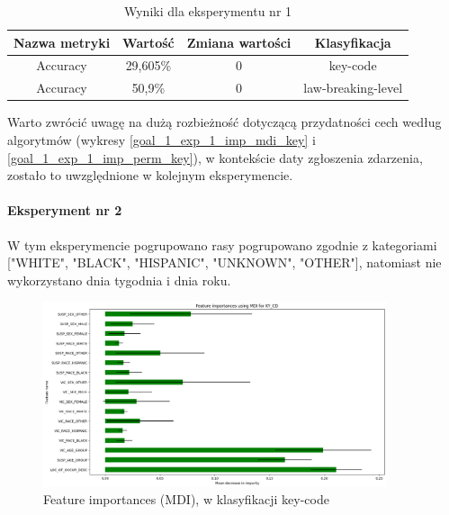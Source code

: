 \documentclass{classrep}
\begin{document}
{{{{                    \begin{table}
                    \centering
                     \begin{tabular}{|c|c|c|c|}
                            \hline
                          Nazwa metryki & Wartość & Zmiana wartości & Klasyfikacja \\ \hline
                            Accuracy &  29,605\% & 0 & key-code\\ \hline
                            Accuracy &  50,9\% & 0 & law-breaking-level\\ \hline
                        \end{tabular}
                        \caption{Wyniki dla eksperymentu nr 1}
                        \label{goal_1_exp_1_results}
                     \end{table}
                     \FloatBarrier

                    Warto zwrócić uwagę na dużą rozbieżność dotyczącą przydatności cech
                    według algorytmów (wykresy \ref{goal_1_exp_1_imp_mdi_key} i
                    \ref{goal_1_exp_1_imp_perm_key}), w kontekście daty zgłoszenia
                    zdarzenia, zostało to uwzględnione w kolejnym eksperymencie.
                }

                \paragraph{Eksperyment nr 2}{
                    W tym eksperymencie pogrupowano rasy pogrupowano zgodnie z
                    kategoriami ["WHITE", "BLACK", "HISPANIC", "UNKNOWN", "OTHER"],
                    natomiast nie wykorzystano dnia tygodnia i dnia roku.

                    \begin{figure}[!htbp]
                        \centering
                        \includegraphics[width=0.9\textwidth]{img/5.1.3/2/Feature importances using MDI for KY_CD.png}
                        \caption{Feature importances (MDI), w klasyfikacji key-code}
                        \label{goal_1_exp_2_imp_mdi_key}
                    \end{figure}
                    
}}}}
\end{document}
